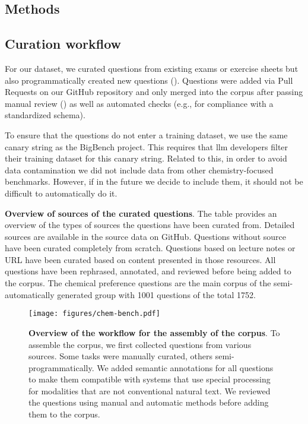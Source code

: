 \documentclass[11pt, oneside]{article}
\begin{document}
\begin{refsection}
\clearpage

\section{Methods}

\subsection{Curation workflow}\label{sec:curation}
For our dataset, we curated questions from existing exams or exercise sheets but also programmatically created new questions ().
Questions were added via Pull Requests on our GitHub repository and only merged into the corpus after passing manual review () as well as automated checks (e.g., for compliance with a standardized schema).

To ensure that the questions do not enter a training dataset, we use the same canary string as the BigBench project.
This requires that \Gls{llm} developers filter their training dataset for this canary string.\autocite{openai2024gpt4, srivastava2022beyond}
Related to this, in order to avoid data contamination we did not include data from other chemistry-focused benchmarks.
However, if in the future we decide to include them, it should not be difficult to automatically do it.



\begin{table}[!h]
    \centering
    \caption{\textbf{Overview of sources of the curated questions}. The table provides an overview of the types of sources the questions have been curated from. Detailed sources are available in the source data on GitHub. Questions without source have been curated completely from scratch. Questions based on lecture notes or URL have been curated based on content presented in those resources. All questions have been rephrased, annotated, and reviewed before being added to the corpus. The chemical preference questions are the main corpus of the semi-automatically generated group with 1001 questions of the total 1752.}
    \label{tab:sources}
\end{table}

\begin{figure}[!h]
    \texttt{[image: figures/chem-bench.pdf]}
    \caption{\textbf{Overview of the workflow for the assembly of the \chembench corpus}.
    To assemble the \chembench corpus, we first collected questions from various sources. Some tasks were manually curated, others semi-programmatically. We added semantic annotations for all questions to make them compatible with systems that use special processing for modalities that are not conventional natural text. We reviewed the questions using manual and automatic methods before adding them to the corpus.}
    \label{fig:curation_workflow}
\end{figure}


\end{refsection}
\end{document}

